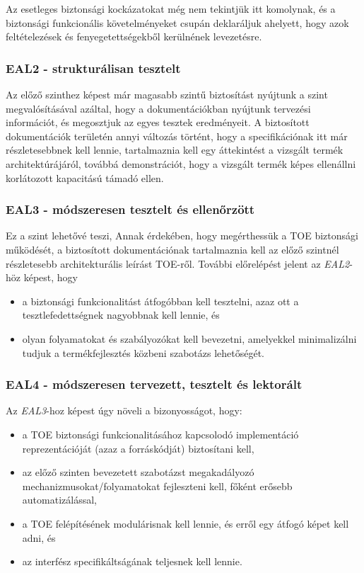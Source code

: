 Az esetleges biztonsági kockázatokat még nem tekintjük itt komolynak, és a biztonsági funkcionális
követelményeket csupán deklaráljuk ahelyett, hogy azok feltételezések és fenyegetettségekből
kerülnének levezetésre.

\subsubsection{EAL2 - strukturálisan tesztelt}
Az előző szinthez képest már magasabb szintű biztosítást nyújtunk a szint megvalósításával azáltal,
hogy a dokumentációkban nyújtunk tervezési információt, és megosztjuk az egyes tesztek eredményeit.
A biztosított dokumentációk területén annyi változás történt, hogy a specifikációnak itt már
részletesebbnek kell lennie, tartalmaznia kell egy áttekintést a vizsgált termék architektúrájáról,
továbbá demonstrációt, hogy a vizsgált termék képes ellenállni korlátozott kapacitású támadó ellen.

\subsubsection{EAL3 - módszeresen tesztelt és ellenőrzött}
Ez a szint lehetővé teszi, 
Annak érdekében, hogy megérthessük a TOE biztonsági működését, a biztosított dokumentációnak
tartalmaznia kell az előző szintnél részletesebb architekturális leírást TOE-ről.
További előrelépést jelent az \emph{EAL2}-höz képest, hogy
\begin{itemize}
    \item a biztonsági funkcionalitást átfogóbban kell tesztelni, azaz ott a tesztlefedettségnek
        nagyobbnak kell lennie, és
    \item olyan folyamatokat és szabályozókat kell bevezetni, amelyekkel minimalizálni tudjuk a
        termékfejlesztés közbeni szabotázs lehetőségét.
\end{itemize}

\subsubsection{EAL4 - módszeresen tervezett, tesztelt és lektorált}

Az \emph{EAL3}-hoz képest úgy növeli a bizonyosságot, hogy:
\begin{itemize}
    \item a TOE biztonsági funkcionalitásához kapcsolodó implementáció reprezentációját
        (azaz a forráskódját) biztosítani kell,
    \item az előző szinten bevezetett szabotázst megakadályozó mechanizmusokat/folyamatokat
        fejleszteni kell, főként erősebb automatizálással,
    \item a TOE felépítésének modulárisnak kell lennie, és erről egy átfogó képet kell adni, és
    \item az interfész specifikáltságának teljesnek kell lennie.
\end{itemize}

